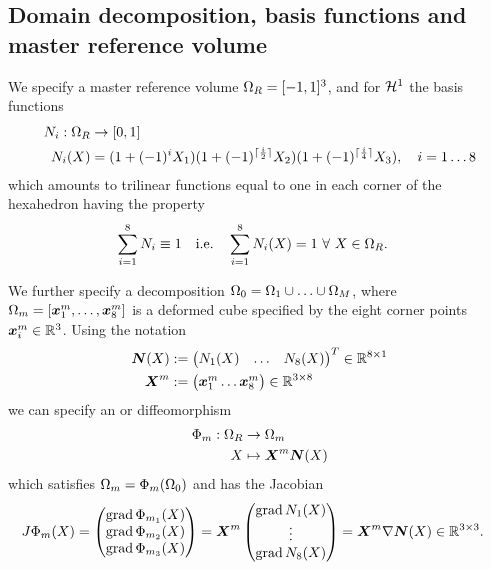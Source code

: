 \subsection{Domain decomposition, basis functions and master reference volume}
We specify a master reference volume $\Omega_R = [-1,1]^3$, and for $\mathcal{H}^1$ the basis functions
\begin{align*}
	N_i:\Omega_R &\to [0,1]\\
	N_i(X)  &= (1+(-1)^{i}X_1)(1+(-1)^{\lceil\frac{i}{2}\rceil}X_2)(1+(-1)^{\lceil\frac{i}{4}\rceil}X_3),\quad i=1\ldots 8
\end{align*}
which amounts to trilinear functions equal to one in each corner of the hexahedron having the property
\begin{align}
	\sum\limits_{i=1}^{8}N_i &\equiv 1 & \text{i.e.}\quad \sum\limits_{i=1}^{8}N_i(X) &= 1 ~\forall~ X\in\Omega_R.
\end{align}

We further specify a decomposition $\Omega_0 = \Omega_1\cup \ldots \cup \Omega_M$, where
$\Omega_m = [\boldsymbol{x}^m_1,\ldots,\boldsymbol{x}^m_8]$ is a deformed cube specified by the eight corner points $\boldsymbol{x}_i^m\in\mathbb{R}^3$.
Using the notation
\begin{align}
	\boldsymbol{N}(X) &:= \left(\begin{matrix}N_1(X) & \ldots & N_8(X)\end{matrix}\right)^T\in\mathbb{R}^{8\times 1}\\
	\boldsymbol{X}^m &:= \left(\begin{matrix}\boldsymbol{x}^m_1 \ldots \boldsymbol{x}^m_8\end{matrix}\right) \in\mathbb{R}^{3\times 8}
\end{align}
 we can specify an  or diffeomorphism
\begin{align}
	\Phi_m : \Omega_R &\to \Omega_m\\
	X &\mapsto \boldsymbol{X}^m\boldsymbol{N}(X)
\end{align}
which satisfies $\Omega_m = \Phi_m(\Omega_0)$ and has the Jacobian
\begin{align}
	J\Phi_m(X) &= \left(\begin{matrix}\operatorname{grad} \Phi_{m_1}(X)\\\operatorname{grad} \Phi_{m_2}(X)\\\operatorname{grad} \Phi_{m_3}(X)\\\end{matrix}\right) 
	= \boldsymbol{X}^m\left(\begin{matrix}\operatorname{grad} N_1(X)\\ \vdots\\\operatorname{grad} N_8(X)\end{matrix}\right) = \boldsymbol{X}^m\nabla\boldsymbol{N}(X) \in \mathbb{R}^{3\times 3}.\label{def:refbasis_jacobian}
\end{align}
 

